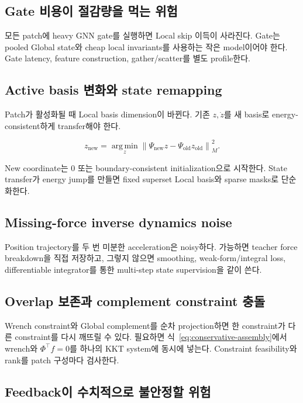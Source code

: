\documentclass[11pt,a4paper]{article}
\newcommand{\argmin}{\operatorname*{arg\,min}}
\begin{document}
\subsection{Gate 비용이 절감량을 먹는 위험}

모든 patch에 heavy GNN gate를 실행하면 Local skip 이득이 사라진다.
Gate는 pooled Global state와 cheap local invariants를 사용하는 작은 model이어야 한다.
Gate latency, feature construction, gather/scatter를 별도 profile한다.

\subsection{Active basis 변화와 state remapping}

Patch가 활성화될 때 Local basis dimension이 바뀐다.
기존 \(z,\dot z\)를 새 basis로 energy-consistent하게 transfer해야 한다.

\begin{equation}
  z_{\mathrm{new}}
  =
  \argmin_z
  \left\|
  \Psi_{\mathrm{new}}z
  -
  \Psi_{\mathrm{old}}z_{\mathrm{old}}
  \right\|_M^2.
\end{equation}

New coordinate는 0 또는 boundary-consistent initialization으로 시작한다.
State transfer가 energy jump를 만들면 fixed superset Local basis와 sparse masks로 단순화한다.

\subsection{Missing-force inverse dynamics noise}

Position trajectory를 두 번 미분한 acceleration은 noisy하다.
가능하면 teacher force breakdown을 직접 저장하고,
그렇지 않으면 smoothing, weak-form/integral loss,
differentiable integrator를 통한 multi-step state supervision을 같이 쓴다.

\subsection{Overlap 보존과 complement constraint 충돌}

Wrench constraint와 Global complement를 순차 projection하면
한 constraint가 다른 constraint를 다시 깨뜨릴 수 있다.
필요하면 식~\eqref{eq:conservative-assembly}에서
wrench와 \(\Phi^\top f=0\)를 하나의 KKT system에 동시에 넣는다.
Constraint feasibility와 rank를 patch 구성마다 검사한다.

\subsection{Feedback이 수치적으로 불안정할 위험}
\end{document}
